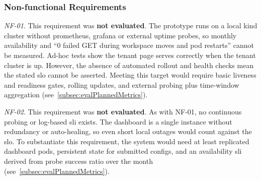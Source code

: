 \documentclass[11pt, a4paper, oneside, listof=totoc]{scrartcl}
\begin{document}
            \subsubsection{Non-functional Requirements}\label{subsubsec:evalNonFunctionalRequirements}
                \begin{enumerate}[label={[\arabic*]:},
                    ref=Challenge~\arabic*,
                    leftmargin=*,
                    itemsep=0.6\baselineskip]

                    \item\label{chal:evalNF01}
                        \textit{NF-01}.
                        This requirement was \textbf{not evaluated}.
                        The prototype runs on a local \gls{kind} cluster without \gls{prometheus}, \gls{grafana}
                        or external uptime probes, so monthly availability and \enquote{0 failed GET
                        during workspace moves and pod restarts} cannot be measured.
                        Ad-hoc tests show the tenant page serves correctly when the tenant cluster
                        is up.
                        However, the absence of automated rollout and health checks mean the stated
                        \gls{slo} cannot be asserted.
                        Meeting this target would require basic liveness and readiness gates,
                        rolling updates, and external probing plus time-window aggregation
                        (see~\autoref{subsec:evalPlannedMetrics}).

                    \item\label{chal:evalNF02}
                        \textit{NF-02}.
                        This requirement was \textbf{not evaluated}.
                        As with NF-01, no continuous probing or log-based \gls{sli} exists.
                        The dashboard is a single instance without redundancy or auto-healing, so
                        even short local outages would count against the \gls{slo}.
                        To substantiate this requirement, the system would need at least replicated
                        dashboard pods, persistent state for submitted configs, and an availability
                        \gls{sli} derived from probe success ratio over the month
                        (see~\autoref{subsec:evalPlannedMetrics}).


\end{enumerate}
\end{document}
